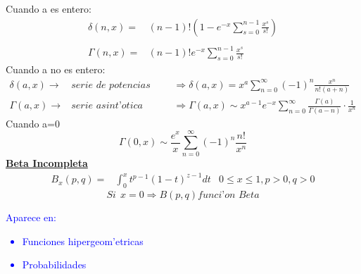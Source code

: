\documentclass{article}
\theoremstyle{definition}
\begin{document}
Cuando a es entero:
\[
\begin{array}{rl}
	\delta (n,x)=& (n-1)!\left(1-e^{-x}\sum^{n-1}_{s=0}\frac{x^s}{s!}\right)\\
	\\
	\Gamma (n,x)=&(n-1)!e^{-x}\sum^{n-1}_{s=0}\frac{x^s}{s!}
\end{array}
\]
Cuando a no es entero:
\[
\begin{array}{rll}
	\delta (a,x)\rightarrow & \textit{serie de potencias para x pequeno} &\Rightarrow \delta (a,x)=x^a\sum^{\infty}_{n=0}(-1)^n\frac{x^n}{n!(a+n)}\\
	\Gamma (a,x)\rightarrow & \textit{serie asint'otica} &\Rightarrow \Gamma (a,x)\sim x^{a-1}e^{-x}\sum^{\infty}_{n=0}\frac{\Gamma (a)}{\Gamma (a-n)}\cdot\frac{1}{x^n}
\end{array}
\]
Cuando a=0
\[\Gamma (0,x)\sim \frac{e^x}{x}\sum^{\infty}_{n=0}(-1)^n \frac{n!}{x^n}\]
\textbf{\underline{Beta Incompleta}}
\[
\begin{array}{rl}
	B_x (p,q)=&\int^{x}_0t^{p-1}(1-t)^{z-1}dt
	& 0\leq x\leq 1,p>0,q>0
\end{array}
\]
\[Si\ \ x=0\Rightarrow B(p,q) \textit{funci'on Beta}\]
\textcolor{blue}{Aparece en:\\
\begin{itemize}
	\item Funciones hipergeom'etricas
	\item Probabilidades
\end{itemize}}
\end{document}
